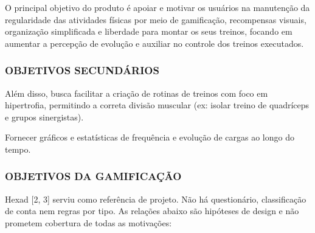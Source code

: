 O principal objetivo do produto é apoiar e motivar os usuários na manutenção da regularidade das atividades físicas por meio de gamificação, recompensas visuais, organização simplificada e liberdade para montar os seus treinos, focando em aumentar a percepção de evolução e auxiliar no controle dos treinos executados.

\subsubsection{OBJETIVOS SECUNDÁRIOS}

Além disso, busca facilitar a criação de rotinas de treinos com foco em hipertrofia, permitindo a correta divisão muscular (ex: isolar treino de quadríceps e grupos sinergistas).

Fornecer gráficos e estatísticas de frequência e evolução de cargas ao longo do tempo.

\subsubsection{OBJETIVOS DA GAMIFICAÇÃO}

Hexad [2, 3] serviu como referência de projeto. Não há questionário, classificação de conta nem regras por tipo. As relações abaixo são hipóteses de design e não prometem cobertura de todas as motivações:

